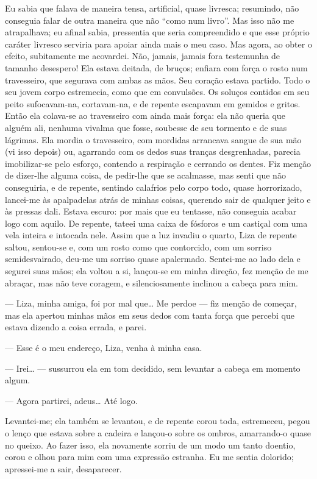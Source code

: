 Eu sabia que falava de maneira tensa, artificial, quase livresca;
resumindo, não conseguia falar de outra maneira que não “como num
livro”. Mas isso não me atrapalhava; eu afinal sabia, pressentia que
seria compreendido e que esse próprio caráter livresco serviria para
apoiar ainda mais o meu caso. Mas agora, ao obter o efeito, subitamente
me acovardei. Não, jamais, jamais fora testemunha de tamanho desespero!
Ela estava deitada, de bruços; enfiara com força o rosto num
travesseiro, que segurava com ambas as mãos. Seu coração estava
partido. Todo o seu jovem corpo estremecia, como que em convulsões. Os
soluços contidos em seu peito sufocavam-na, cortavam-na, e de repente
escapavam em gemidos e gritos. Então ela colava-se ao travesseiro com
ainda mais força: ela não queria que alguém ali, nenhuma vivalma que
fosse, soubesse de seu tormento e de suas lágrimas. Ela mordia o
travesseiro, com mordidas arrancava sangue de sua mão (vi isso depois)
ou, agarrando com os dedos suas tranças desgrenhadas, parecia
imobilizar-se pelo esforço, contendo a respiração e cerrando os dentes.
Fiz menção de dizer-lhe alguma coisa, de pedir-lhe que se acalmasse,
mas senti que não conseguiria, e de repente, sentindo calafrios pelo
corpo todo, quase horrorizado, lancei-me às apalpadelas atrás de minhas
coisas, querendo sair de qualquer jeito e às pressas dali. Estava
escuro: por mais que eu tentasse, não conseguia acabar logo com aquilo.
De repente, tateei uma caixa de fósforos e um castiçal com uma vela
inteira e intocada nele. Assim que a luz invadiu o quarto, Liza de
repente saltou, sentou-se e, com um rosto como que contorcido, com um
sorriso semidesvairado, deu-me um sorriso quase apalermado. Sentei-me
ao lado dela e segurei suas mãos; ela voltou a si, lançou-se em minha
direção, fez menção de me abraçar, mas não teve coragem, e
silenciosamente inclinou a cabeça para mim.

--- Liza, minha amiga, foi por mal que\ldots{} Me perdoe --- fiz menção de
começar, mas ela apertou minhas mãos em seus dedos com tanta força que
percebi que estava dizendo a coisa errada, e parei.

--- Esse é o meu endereço, Liza, venha à minha casa.

--- Irei\ldots{} --- sussurrou ela em tom decidido, sem levantar a cabeça em
momento algum.

--- Agora partirei, adeus\ldots{} Até logo.

Levantei-me; ela também se levantou, e de repente corou toda,
estremeceu, pegou o lenço que estava sobre a cadeira e lançou-o sobre
os ombros, amarrando-o quase no queixo. Ao fazer isso, ela novamente
sorriu de um modo um tanto doentio, corou e olhou para mim com uma
expressão estranha. Eu me sentia dolorido; apressei-me a sair,
desaparecer.

